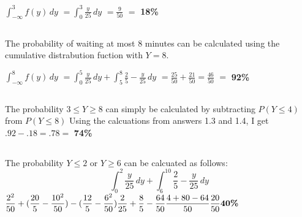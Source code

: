 \documentclass[12pt, letterpaper]{article}
\begin{document}
$ \int_{-\infty}^{3} f(y) \,dy$
$ = \int_{0}^{3} \frac{y}{25} \,dy$
$ = \frac{9}{50} $
$ = $ \textbf{18\%}

\subsection{}
The probability of waiting at most 8 minutes can be calculated using the cumulative distrabution fuction with $Y = 8$.

$ \int_{-\infty}^{8} f(y) \,dy$
$ = \int_{0}^{5} \frac{y}{25} \,dy + \int_{5}^{8} \frac{2}{5} - \frac{y}{25} \,dy$
\newline
\newline
$ = \frac{25}{50} + \frac{21}{50} = \frac{46}{50}$
$ = $ \textbf{92\%}

\subsection{}

The probability $3 \le Y \ge 8$ can simply be calculated by subtracting $P(Y \le 4)$ from $P(Y \le 8)$
Using the calcuations from answers 1.3 and 1.4, I get $.92 - .18 = .78 = $ \textbf{74\%}
\subsection{}
The probability $Y \le 2$ or $Y \ge 6$ can be calcuated as follows:
\[
	\int_{0}^{2} \frac{y}{25}\,dy + \int_{6}^{10} \frac{2}{5} - \frac{y}{25}\,dy
\]
\(
\dfrac{2^{2}}{50} + (\dfrac{20}{5} - \dfrac{10^{2}}{50}) - (\dfrac{12}{5} - \dfrac{6^{2}}{50}) \\
\\
\dfrac{2}{25} + \dfrac{8}{5} - \dfrac{64}{50} \\
\\
\dfrac{4+80-64}{50} \\
\\
\dfrac{20}{50} \\
\\
\textbf{40\%}
\)
\section{}
\subsection{}

\begin{center}
\end{center}
\end{document}
